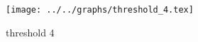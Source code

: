 \begin{figure}[h] \centering\texttt{[image: ../../graphs/threshold\_4.tex]}\caption{threshold 4}\label{gr:threshold_4} \end{figure}
